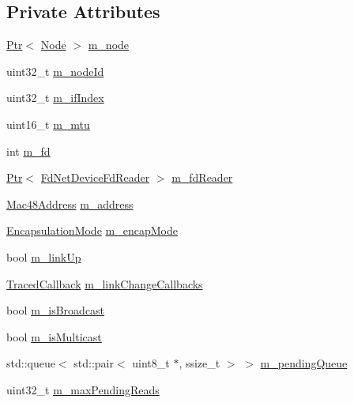 \subsection*{Private Attributes}
\begin{DoxyCompactItemize}
\item 
\hyperlink{classns3_1_1Ptr}{Ptr}$<$ \hyperlink{classns3_1_1Node}{Node} $>$ \hyperlink{classns3_1_1FdNetDevice_a344e2f5a2628c1a0305d5b4bbf72f8c6}{m\+\_\+node}
\item 
uint32\+\_\+t \hyperlink{classns3_1_1FdNetDevice_aed43dab9b55bd308388c3a9f1510a709}{m\+\_\+node\+Id}
\item 
uint32\+\_\+t \hyperlink{classns3_1_1FdNetDevice_a1b65e4f3e463c7ae49267e26213a6392}{m\+\_\+if\+Index}
\item 
uint16\+\_\+t \hyperlink{classns3_1_1FdNetDevice_a26eb80ddedbacaf1f5a1c19940e7225d}{m\+\_\+mtu}
\item 
int \hyperlink{classns3_1_1FdNetDevice_a2351bba8f2719557d98ff85e88b451a5}{m\+\_\+fd}
\item 
\hyperlink{classns3_1_1Ptr}{Ptr}$<$ \hyperlink{classns3_1_1FdNetDeviceFdReader}{Fd\+Net\+Device\+Fd\+Reader} $>$ \hyperlink{classns3_1_1FdNetDevice_ac678c4f411e1982c5d2416f7c05ebd3b}{m\+\_\+fd\+Reader}
\item 
\hyperlink{classns3_1_1Mac48Address}{Mac48\+Address} \hyperlink{classns3_1_1FdNetDevice_ad6ce5cc7c15f7a9c79a0c822aea60036}{m\+\_\+address}
\item 
\hyperlink{classns3_1_1FdNetDevice_abdacbf10c181f50998a98e7688016618}{Encapsulation\+Mode} \hyperlink{classns3_1_1FdNetDevice_aa5d97abfd57576f6b80423ac764e5cc8}{m\+\_\+encap\+Mode}
\item 
bool \hyperlink{classns3_1_1FdNetDevice_abf646fbe52523693488607b6ee9a7578}{m\+\_\+link\+Up}
\item 
\hyperlink{classns3_1_1TracedCallback}{Traced\+Callback} \hyperlink{classns3_1_1FdNetDevice_a3e8d275156225016c9e518ae5429ade7}{m\+\_\+link\+Change\+Callbacks}
\item 
bool \hyperlink{classns3_1_1FdNetDevice_a0c9a5b7d7802458647ac8f2af3e80176}{m\+\_\+is\+Broadcast}
\item 
bool \hyperlink{classns3_1_1FdNetDevice_a781a28aa762e85bca94a29f3686ee15b}{m\+\_\+is\+Multicast}
\item 
std\+::queue$<$ std\+::pair$<$ uint8\+\_\+t $\ast$, ssize\+\_\+t $>$ $>$ \hyperlink{classns3_1_1FdNetDevice_a58492550a84c8c2c959b4d4904342d70}{m\+\_\+pending\+Queue}
\item 
uint32\+\_\+t \hyperlink{classns3_1_1FdNetDevice_a4be8b630492f263f0cb5f9c5fd223eac}{m\+\_\+max\+Pending\+Reads}

\end{DoxyCompactItemize}
